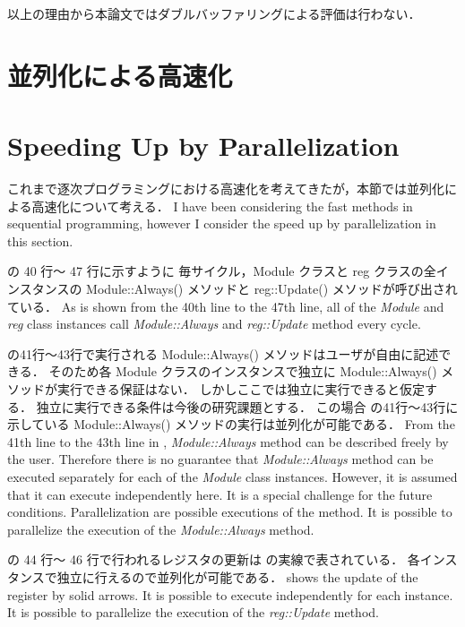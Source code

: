 以上の理由から本論文ではダブルバッファリングによる評価は行わない．

\fi

\section{並列化による高速化} \label{ss:parallel}
\fi
\section{Speeding Up by Parallelization} \label{ss:parallel}

これまで逐次プログラミングにおける高速化を考えてきたが，本節では並列化による高速化について考える．
\fi
I have been considering the fast methods in sequential programming,
however I consider the speed up by parallelization in this section.

 の 40 行〜 47 行に示すように
毎サイクル，Module クラスと reg クラスの全インスタンスの Module::Always() メソッドと reg::Update() メソッドが呼び出されている．
\fi
As  is shown from the 40th line to the 47th line,
all of the \textit{Module} and \textit{reg} class instances
call \textit{Module::Always} and \textit{reg::Update} method every cycle.

 の41行〜43行で実行される Module::Always() メソッドはユーザが自由に記述できる．
そのため各 Module クラスのインスタンスで独立に Module::Always() メソッドが実行できる保証はない．
しかしここでは独立に実行できると仮定する．
独立に実行できる条件は今後の研究課題とする．
この場合 の41行〜43行に示している Module::Always() メソッドの実行は並列化が可能である．
\fi
From the 41th line to the 43th line in ,
\textit{Module::Always} method can be described freely by the user.
Therefore there is no guarantee that \textit{Module::Always} method can be executed separately for each of the \textit{Module} class instances.
However, it is assumed that it can execute independently here.
It is a special challenge for the future conditions.
Parallelization are possible executions of the method.
It is possible to parallelize the execution of the \textit{Module::Always} method.

 の 44 行〜 46 行で行われるレジスタの更新は の実線で表されている．
各インスタンスで独立に行えるので並列化が可能である．
\fi
{} shows the update of the register by solid arrows.
It is possible to execute independently for each instance.
It is possible to parallelize the execution of the \textit{reg::Update} method.

